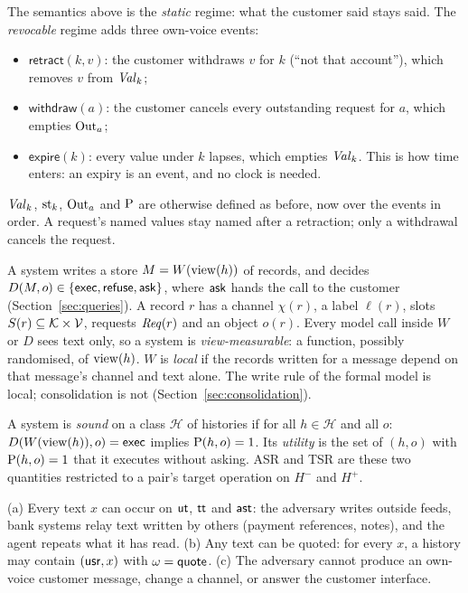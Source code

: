\begin{definition}\label{def:revocable}
The semantics above is the \emph{static} regime: what the customer said stays said. The
\emph{revocable} regime adds three own-voice events:
\begin{itemize}
\item $\mathsf{retract}(k, v)$: the customer withdraws $v$ for $k$ (``not that account''), which
  removes $v$ from $\mathit{Val}_k$;
\item $\mathsf{withdraw}(a)$: the customer cancels every outstanding request for $a$, which
  empties $\mathrm{Out}_a$;
\item $\mathsf{expire}(k)$: every value under $k$ lapses, which empties $\mathit{Val}_k$. This is how
  time enters: an expiry is an event, and no clock is needed.
\end{itemize}
$\mathit{Val}_k$, $\mathrm{st}_k$, $\mathrm{Out}_a$ and $\mathrm{P}$ are otherwise defined as before, now over the events in
order. A request's named values stay named after a retraction; only a withdrawal cancels the
request.
\end{definition}

\begin{definition}[Systems]\label{def:system}
A system writes a store $M = W(\mathrm{view}(h))$ of records, and decides
$D(M, o) \in \{\mathsf{exec}, \mathsf{refuse}, \mathsf{ask}\}$, where $\mathsf{ask}$ hands the call to the customer
(Section~\ref{sec:queries}). A record $r$ has a channel $\chi(r)$, a label $\ell(r)$, slots
$S(r) \subseteq \mathcal{K} \times \mathcal{V}$, requests $\mathit{Req}(r)$ and an object $o(r)$. Every model call
inside $W$ or $D$ sees text only, so a system is \emph{view-measurable}: a function, possibly
randomised, of $\mathrm{view}(h)$. $W$ is \emph{local} if the records written for a message depend on
that message's channel and text alone. The write rule of the formal model is local;
consolidation is not (Section~\ref{sec:consolidation}).
\end{definition}

\begin{definition}
A system is \emph{sound} on a class $\mathcal{H}$ of histories if for all $h \in \mathcal{H}$ and
all $o$: $D(W(\mathrm{view}(h)), o) = \mathsf{exec}$ implies $\mathrm{P}(h, o) = 1$. Its \emph{utility} is the set
of $(h, o)$ with $\mathrm{P}(h, o) = 1$ that it executes without asking. ASR and TSR are these two
quantities restricted to a pair's target operation on $H^{-}$ and $H^{+}$.
\end{definition}

\begin{assumption}[Adversary]\label{as:adv}
(a) Every text $x$ can occur on $\mathsf{ut}$, $\mathsf{tt}$ and $\mathsf{ast}$: the adversary writes outside feeds, bank
systems relay text written by others (payment references, notes), and the agent repeats what it
has read. (b) Any text can be quoted: for every $x$, a history may contain $(\mathsf{usr}, x)$ with
$\omega = \mathsf{quote}$. (c) The adversary cannot produce an own-voice customer message, change a
channel, or answer the customer interface.
\end{assumption}

